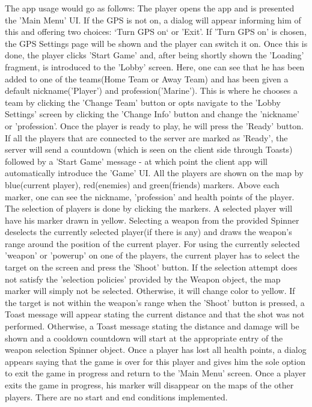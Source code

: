 The app usage would go as follows: The player opens the app and is presented the
'Main Menu' UI. If the GPS is not on, a dialog will appear informing him of
this and offering two choices: `Turn GPS on` or 'Exit'. If 'Turn GPS on' is
chosen, the GPS Settings page will be shown and the player can switch it on.
Once this is done, the player clicks 'Start Game' and, after being shortly shown
the 'Loading' fragment, is introduced to the 'Lobby' screen. Here, one can see
that he has been added to one of the teams(Home Team or Away Team) and has been
given a default nickname('Player') and profession('Marine'). This is where he
chooses a team by clicking the 'Change Team' button or opts navigate to the
'Lobby Settings' screen by clicking the 'Change Info' button and change the
'nickname' or 'profession'. Once the player is ready to play, he will press the
'Ready' button. If all the players that are connected to the server are marked
as 'Ready', the server will send a countdown (which is seen on the client side
through Toasts) followed by a 'Start Game' message - at which point the client
app will automatically introduce the 'Game' UI. All the players are shown on the
map by blue(current player), red(enemies) and green(friends) markers. Above each
marker, one can see the nickname, 'profession' and health points of the player.
The selection of players is done by clicking the markers. A selected player will
have his marker drawn in yellow. Selecting a weapon from the provided Spinner
deselects the currently selected player(if there is any) and draws the weapon's
range around the position of the current player. For using the currently
selected 'weapon' or 'powerup' on one of the players, the current player has to
select the target on the screen and press the 'Shoot' button. If the selection
attempt does not satisfy the 'selection policies' provided by the Weapon object,
the map marker will simply not be selected. Otherwise, it will change color to
yellow. If the target is not within the weapon's range when the 'Shoot' button
is pressed, a Toast message will appear stating the current distance and that
the shot was not performed. Otherwise, a Toast message stating the distance and
damage will be shown and a cooldown countdown will start at the appropriate
entry of the weapon selection Spinner object. Once a player has lost all health
points, a dialog appears saying that the game is over for this player and gives
him the sole option to exit the game in progress and return to the 'Main Menu'
screen. Once a player exits the game in progress, his marker will disappear on
the maps of the other players. There are no start and end conditions
implemented.

